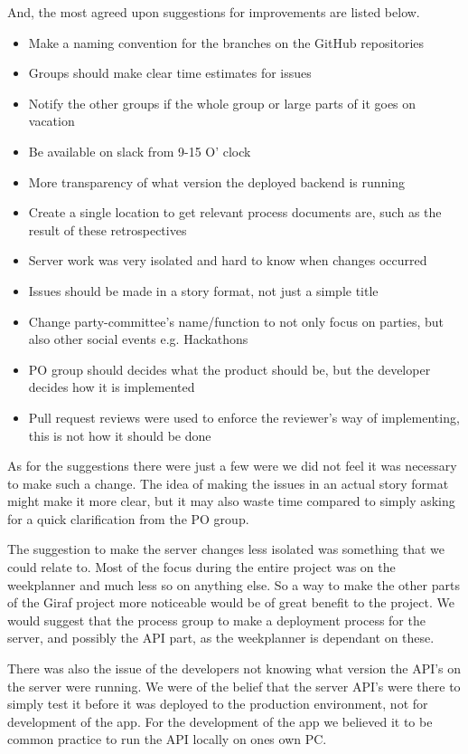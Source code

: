 And, the most agreed upon suggestions for improvements are listed below.
\begin{itemize}
  \item Make a naming convention for the branches on the GitHub repositories
  \item Groups should make clear time estimates for issues
  \item Notify the other groups if the whole group or large parts of it goes on vacation
  \item Be available on slack from 9-15 O' clock
  \item More transparency of what version the deployed backend is running
  \item Create a single location to get relevant process documents are, such as the result of these retrospectives
  \item Server work was very isolated and hard to know when changes occurred
  \item Issues should be made in a story format, not just a simple title
  \item Change party-committee's name/function to not only focus on parties, but also other social events e.g. Hackathons
  \item PO group should decides what the product should be, but the developer decides how it is implemented
  \item Pull request reviews were used to enforce the reviewer's way of implementing, this is not how it should be done
\end{itemize}

As for the suggestions there were just a few were we did not feel it was necessary to make such a change.
The idea of making the issues in an actual story format might make it more clear, but it may also waste time compared to simply asking for a quick clarification from the PO group. 

The suggestion to make the server changes less isolated was something that we could relate to.
Most of the focus during the entire project was on the weekplanner and much less so on anything else.
So a way to make the other parts of the Giraf project more noticeable would be of great benefit to the project.
We would suggest that the process group to make a deployment process for the server, and possibly the API part, as the weekplanner is dependant on these.

There was also the issue of the developers not knowing what version the API's on the server were running.
We were of the belief that the server API's were there to simply test it before it was deployed to the production environment, not for development of the app.
For the development of the app we believed it to be common practice to run the API locally on ones own PC.

